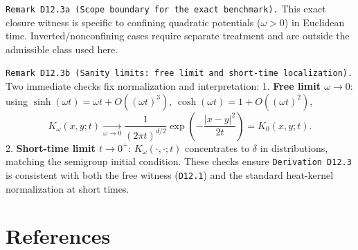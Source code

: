 \documentclass[
]{article}
\begin{document}
\texttt{Remark\ D12.3a\ (Scope\ boundary\ for\ the\ exact\ benchmark).}
This exact closure witness is specific to confining quadratic potentials
(\(\omega>0\)) in Euclidean time. Inverted/nonconfining cases require
separate treatment and are outside the admissible class used here.

\texttt{Remark\ D12.3b\ (Sanity\ limits:\ free\ limit\ and\ short-time\ localization).}
Two immediate checks fix normalization and interpretation: 1.
\textbf{Free limit \(\omega\to0\)}: using
\(\sinh(\omega t)=\omega t+O((\omega t)^3)\),
\(\cosh(\omega t)=1+O((\omega t)^2)\), \[
K_\omega(x,y;t)\xrightarrow[\omega\to0]{}
\frac{1}{(2\pi t)^{d/2}}\exp\!\left(-\frac{|x-y|^2}{2t}\right)
=K_0(x,y;t).
\] 2. \textbf{Short-time limit \(t\to0^+\)}: \(K_\omega(\cdot,\cdot;t)\)
concentrates to \(\delta\) in distributions, matching the semigroup
initial condition. These checks ensure \texttt{Derivation\ D12.3} is
consistent with both the free witness (\texttt{D12.1}) and the standard
heat-kernel normalization at short times.

\hypertarget{references}{%
\section{References}\label{references}}
\end{document}
